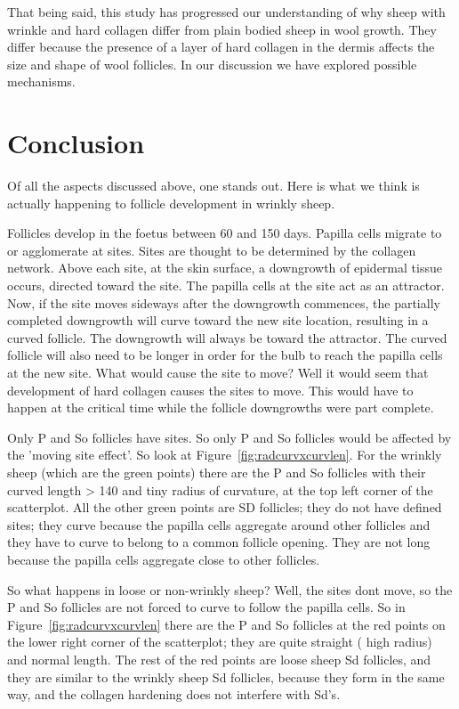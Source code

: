 \documentclass[titlepage]{article}  %
\begin{document}
That being said, this study has progressed our understanding of why sheep with wrinkle and hard collagen differ from plain bodied sheep in wool growth. They differ because the presence of a layer of hard collagen in the dermis affects the size and shape of wool follicles. In our discussion we have explored possible mechanisms.

\section{Conclusion}
Of all the aspects discussed above, one stands out. Here is what we think is actually happening to follicle development in wrinkly sheep.

Follicles develop in the foetus between 60 and 150 days. Papilla cells migrate to  or agglomerate at sites. Sites are thought to be determined by the collagen network. Above each site, at the skin surface, a downgrowth of epidermal tissue occurs, directed toward the site. The papilla cells at the site act as an attractor.  Now, if the site moves sideways after the downgrowth commences, the partially completed downgrowth will curve toward the new site location, resulting in a curved follicle. The downgrowth will always be toward the attractor. The curved follicle will also need to be longer in order for the bulb to reach the papilla cells at the new site. What would cause the site to move? Well  it would seem that development of hard collagen causes the sites to move. This would have to happen at the critical time while the follicle downgrowths were part complete.

Only P and So follicles have sites. So only P and So follicles would be affected by the 'moving site effect'. So look at Figure~\ref{fig:radcurvxcurvlen}. For the wrinkly sheep  (which are the green points) there are the P and So follicles with their curved length > 140 and tiny radius of curvature, at the top left corner of the scatterplot. All the other green points are SD follicles; they do not have defined sites; they curve because the papilla cells aggregate around other follicles and they have to curve to belong to a common follicle opening. They are not long because the papilla cells aggregate close to other follicles.

So what happens in loose or non-wrinkly sheep? Well, the sites dont move, so the P and So follicles are not forced to curve to follow the papilla cells. So in Figure~\ref{fig:radcurvxcurvlen} there are the P and So follicles at the red points on the lower right corner of the scatterplot; they are quite straight ( high radius) and normal length. The rest of the red points are loose sheep Sd follicles, and they are similar to the wrinkly sheep Sd follicles, because they form in the same way, and the collagen hardening does not interfere with Sd's.
\end{document}
